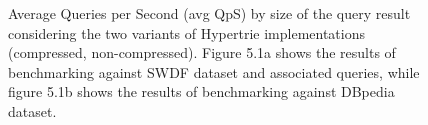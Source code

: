 \begin{figure}[h]
	\centering
	
	
	\caption{Average Queries per Second (avg QpS) by size of the query result considering the two variants of Hypertrie implementations (compressed, non-compressed). Figure 5.1a shows the results of benchmarking against SWDF dataset and associated queries, while figure 5.1b shows  the results of benchmarking against DBpedia dataset.}
	\label{fig:benchmarks_graph}
\end{figure}

\clearpage